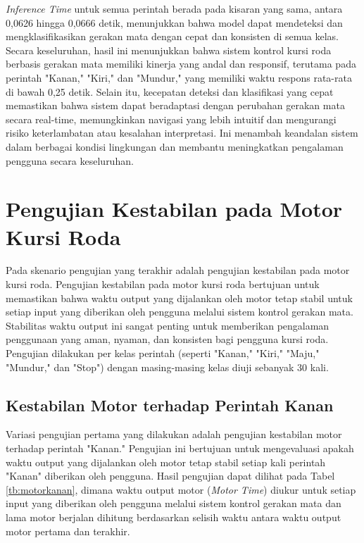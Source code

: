 \emph{Inference Time} untuk semua perintah berada pada kisaran yang sama, antara 0,0626 hingga 0,0666 detik, menunjukkan bahwa model dapat mendeteksi dan mengklasifikasikan gerakan mata dengan cepat dan konsisten di semua kelas. Secara keseluruhan, hasil ini menunjukkan bahwa sistem kontrol kursi roda berbasis gerakan mata memiliki kinerja yang andal dan responsif, terutama pada perintah "Kanan," "Kiri," dan "Mundur," yang memiliki waktu respons rata-rata di bawah 0,25 detik. Selain itu, kecepatan deteksi dan klasifikasi yang cepat memastikan bahwa sistem dapat beradaptasi dengan perubahan gerakan mata secara real-time, memungkinkan navigasi yang lebih intuitif dan mengurangi risiko keterlambatan atau kesalahan interpretasi. Ini menambah keandalan sistem dalam berbagai kondisi lingkungan dan membantu meningkatkan pengalaman pengguna secara keseluruhan.

\section{Pengujian Kestabilan pada Motor Kursi Roda}

Pada skenario pengujian yang terakhir adalah pengujian kestabilan pada motor kursi roda. Pengujian kestabilan pada motor kursi roda bertujuan untuk memastikan bahwa waktu output yang dijalankan oleh motor tetap stabil untuk setiap input yang diberikan oleh pengguna melalui sistem kontrol gerakan mata. Stabilitas waktu output ini sangat penting untuk memberikan pengalaman penggunaan yang aman, nyaman, dan konsisten bagi pengguna kursi roda. Pengujian dilakukan per kelas perintah (seperti "Kanan," "Kiri," "Maju," "Mundur," dan "Stop") dengan masing-masing kelas diuji sebanyak 30 kali.

\subsection{Kestabilan Motor terhadap Perintah Kanan}

Variasi pengujian pertama yang dilakukan adalah pengujian kestabilan motor terhadap perintah "Kanan." Pengujian ini bertujuan untuk mengevaluasi apakah waktu output yang dijalankan oleh motor tetap stabil setiap kali perintah "Kanan" diberikan oleh pengguna. Hasil pengujian dapat dilihat pada Tabel \ref{tb:motorkanan}, dimana waktu output motor (\emph{Motor Time}) diukur untuk setiap input yang diberikan oleh pengguna melalui sistem kontrol gerakan mata dan lama motor berjalan dihitung berdasarkan selisih waktu antara waktu output motor pertama dan terakhir.

